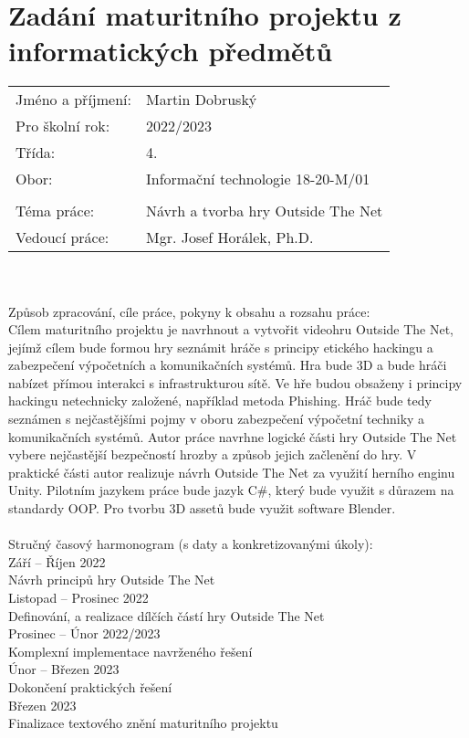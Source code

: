 \chapter*{Zadání maturitního projektu z informatických předmětů}
\begin{tabular}{l l}
    Jméno a příjmení: & Martin Dobruský \\
    Pro školní rok: & 2022/2023 \\
    Třída: & 4. \\
	Obor: & Informační technologie 18-20-M/01 \\\\

    Téma práce: & Návrh a tvorba hry Outside The Net \\
    Vedoucí práce: & Mgr. Josef Horálek, Ph.D. \\
\end{tabular} \\\\

Způsob zpracování, cíle práce, pokyny k obsahu a rozsahu práce: \\
Cílem maturitního projektu je navrhnout a vytvořit videohru Outside The Net, jejímž cílem bude formou hry seznámit hráče s principy etického hackingu a zabezpečení výpočetních a komunikačních systémů. Hra bude 3D a bude hráči nabízet přímou interakci s infrastrukturou sítě. Ve hře budou obsaženy i principy hackingu netechnicky založené, například metoda Phishing. Hráč bude tedy seznámen s nejčastějšími pojmy v oboru zabezpečení výpočetní techniky a komunikačních systémů. Autor práce navrhne logické části hry Outside The Net vybere nejčastější bezpečností hrozby a způsob jejich začlenění do hry. V praktické části autor realizuje návrh Outside The Net za využití herního enginu Unity. Pilotním jazykem práce bude jazyk C\#, který bude využit s důrazem na standardy OOP. Pro tvorbu 3D assetů bude využit software Blender. \\\\
Stručný časový harmonogram (s daty a konkretizovanými úkoly): \\
Září – Říjen 2022 \\
\hspace{1cm}Návrh principů hry Outside The Net \\
Listopad – Prosinec 2022 \\
\hspace{1cm}Definování, a realizace dílčích částí hry Outside The Net \\
Prosinec – Únor 2022/2023 \\
\hspace{1cm}Komplexní implementace navrženého řešení \\
Únor – Březen 2023 \\
\hspace{1cm}Dokončení praktických řešení \\
Březen 2023 \\
\hspace{1cm}Finalizace textového znění maturitního projektu \\
